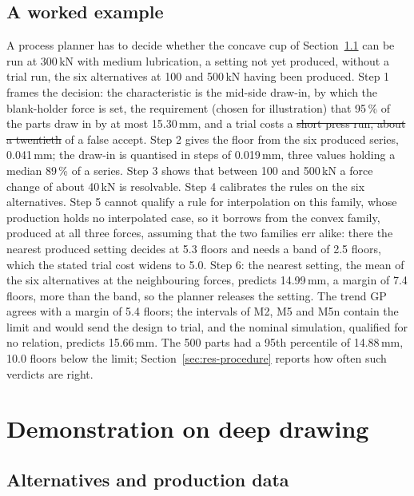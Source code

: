 \documentclass[pdflatex,sn-basic,lineno]{sn-jnl}
\providecommand{\DIFadd}[1]{{\protect\color{blue}\uwave{#1}}} %
\providecommand{\DIFdel}[1]{{\protect\color{red}\sout{#1}}}                      %
\providecommand{\DIFaddbegin}{} %
\providecommand{\DIFaddend}{} %
\providecommand{\DIFdelbegin}{} %
\providecommand{\DIFdelend}{} %
\newcommand{\DIFscaledelfig}{0.5}
\newlength{\DIFdelgraphicswidth} %
\newlength{\DIFdelgraphicsheight} %
\newcommand{\DIFaddincludegraphics}[2][]{{\color{blue}\fbox{\DIFOincludegraphics[#1]{#2}}}} %
\newcommand{\DIFdelincludegraphics}[2][]{%
\sbox{\DIFdelgraphicsbox}{\DIFOincludegraphics[#1]{#2}}%
\settoboxwidth{\DIFdelgraphicswidth}{\DIFdelgraphicsbox} %
\settoboxtotalheight{\DIFdelgraphicsheight}{\DIFdelgraphicsbox} %
\scalebox{\DIFscaledelfig}{%
\parbox[b]{\DIFdelgraphicswidth}{\usebox{\DIFdelgraphicsbox}\\[-\baselineskip] \rule{\DIFdelgraphicswidth}{0em}}\llap{\resizebox{\DIFdelgraphicswidth}{\DIFdelgraphicsheight}{%
\setlength{\unitlength}{\DIFdelgraphicswidth}%
\begin{picture}(1,1)%
\thicklines\linethickness{2pt} %
{\color[rgb]{1,0,0}\put(0,0){\framebox(1,1){}}}%
{\color[rgb]{1,0,0}\put(0,0){\line( 1,1){1}}}%
{\color[rgb]{1,0,0}\put(0,1){\line(1,-1){1}}}%
\end{picture}%
}\hspace*{3pt}}} %
} %
\DeclareRobustCommand{\DIFaddbegin}{\DIFOaddbegin \let\includegraphics\DIFaddincludegraphics} %
\DeclareRobustCommand{\DIFaddend}{\DIFOaddend \let\includegraphics\DIFOincludegraphics} %
\DeclareRobustCommand{\DIFdelbegin}{\DIFOdelbegin \let\includegraphics\DIFdelincludegraphics} %
\DeclareRobustCommand{\DIFdelend}{\DIFOaddend \let\includegraphics\DIFOincludegraphics} %
\begin{document}
\subsection{A worked example}\label{sec:example}

A process planner has to decide whether the concave cup of Section~\ref{sec:data} can be run at 300\,kN with medium lubrication, a setting not yet produced, without a trial run, the six alternatives at 100 and 500\,kN having been produced. Step 1 frames the decision: the characteristic is the mid-side draw-in, by which the blank-holder force is set, the requirement (chosen for illustration) that 95\,\% of the parts draw in by at most 15.30\,mm, and a trial costs a \DIFdelbegin \DIFdel{short press run, about a twentieth }\DIFdelend \DIFaddbegin \DIFadd{twentieth and a false reject half }\DIFaddend of a false accept. Step 2 gives the floor from the six produced series, 0.041\,mm; the draw-in is quantised in steps of 0.019\,mm, three values holding a median 89\,\% of a series. Step 3 shows that between 100 and 500\,kN a force change of about 40\,kN is resolvable. Step 4 calibrates the rules on the six alternatives. Step 5 cannot qualify a rule for interpolation on this family, whose production holds no interpolated case, so it borrows from the convex family, produced at all three forces, assuming that the two families err alike: there the nearest produced setting decides at 5.3 floors and needs a band of 2.5 floors, which the stated trial cost widens to 5.0. Step 6: the nearest setting, the mean of the six alternatives at the neighbouring forces, predicts 14.99\,mm, a margin of 7.4 floors, more than the band, so the planner releases the setting. The trend GP agrees with a margin of 5.4 floors; the intervals of M2, M5 and M5n contain the limit and would send the design to trial, and the nominal simulation, qualified for no relation, predicts 15.66\,mm. The 500 parts had a 95th percentile of 14.88\,mm, 10.0 floors below the limit; Section~\ref{sec:res-procedure} reports how often such verdicts are right.

\section{Demonstration on deep drawing}\label{sec:demo}

\subsection{Alternatives and production data}\label{sec:data}
\end{document}
